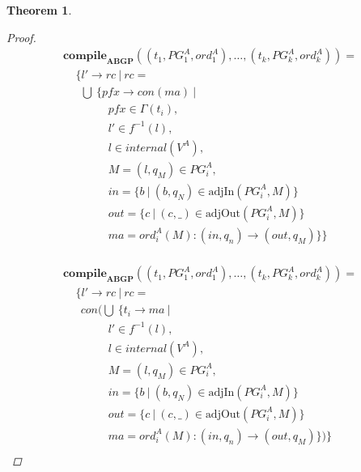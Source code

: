 \documentclass[twocolumn]{sig-alternate-10pt}
\newtheorem{thm}{Theorem}[section]
\begin{document}
\begin{thm}
\begin{proof}
  \[ \begin{array}{l}
     \textbf{compile}_\textbf{ABGP}( (t_1,PG^A_1,ord^A_1), \dots, (t_k,PG^A_k,ord^A_k) ) = \\
     ~~~~~ \{ l' \rightarrow rc ~\vert~ rc = \\
     ~~~~~~~ \bigcup~ \{ pfx \rightarrow con(ma) ~\vert~ \\
     ~~~~~~~~~~~~~~~~~~ pfx \in \Gamma(t_i), \\
     ~~~~~~~~~~~~~~~~~~ l' \in f^{-1}(l), \\
     ~~~~~~~~~~~~~~~~~~ l \in internal(V^A), \\
     ~~~~~~~~~~~~~~~~~~ M = (l,q_M) \in PG^A_i, \\
     ~~~~~~~~~~~~~~~~~~ in = \{ b ~\vert~ (b,q_N) \in \text{adjIn}(PG^A_i,M) \} \\
     ~~~~~~~~~~~~~~~~~~ out = \{ c ~\vert~ (c,\_) \in \text{adjOut}(PG^A_i,M) \} \\
     ~~~~~~~~~~~~~~~~~~ ma = ord^A_i(M) : (in,q_n) \rightarrow (out,q_M) \} \} \\
  \end{array} \]%

  \[ \begin{array}{l}
     \textbf{compile}_\textbf{ABGP}( (t_1,PG^A_1,ord^A_1), \dots, (t_k,PG^A_k,ord^A_k) ) = \\
     ~~~~~ \{ l' \rightarrow rc ~\vert~ rc = \\
     ~~~~~~~ con(\bigcup~ \{ t_i \rightarrow ma ~\vert~ \\
     ~~~~~~~~~~~~~~~~~~ l' \in f^{-1}(l), \\
     ~~~~~~~~~~~~~~~~~~ l \in internal(V^A), \\
     ~~~~~~~~~~~~~~~~~~ M = (l,q_M) \in PG^A_i, \\
     ~~~~~~~~~~~~~~~~~~ in = \{ b ~\vert~ (b,q_N) \in \text{adjIn}(PG^A_i,M) \} \\
     ~~~~~~~~~~~~~~~~~~ out = \{ c ~\vert~ (c,\_) \in \text{adjOut}(PG^A_i,M) \} \\
     ~~~~~~~~~~~~~~~~~~ ma = ord^A_i(M) : (in,q_n) \rightarrow (out,q_M) \}) \} \\
  \end{array} \]%



\end{proof}
\end{thm}
\end{document}
